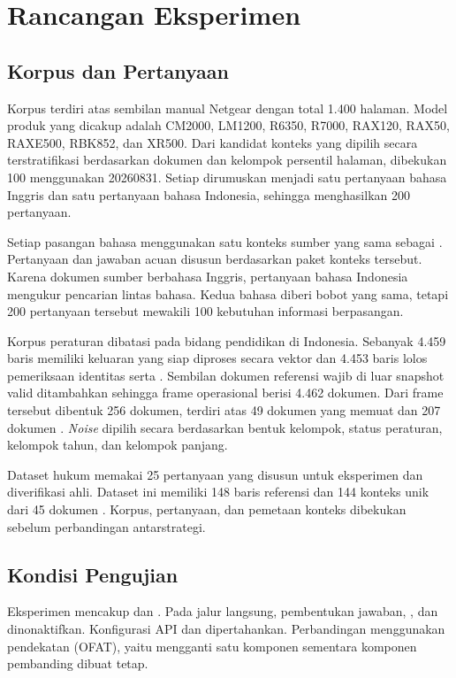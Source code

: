\section{Rancangan Eksperimen}
\subsection{Korpus dan Pertanyaan}
Korpus  terdiri atas sembilan manual Netgear dengan total 1.400 halaman. Model produk yang dicakup adalah CM2000, LM1200, R6350, R7000, RAX120, RAX50, RAXE500, RBK852, dan XR500. Dari kandidat konteks yang dipilih secara terstratifikasi berdasarkan dokumen dan kelompok persentil halaman, dibekukan 100  menggunakan  20260831. Setiap  dirumuskan menjadi satu pertanyaan bahasa Inggris dan satu pertanyaan bahasa Indonesia, sehingga menghasilkan 200 pertanyaan.

Setiap pasangan bahasa menggunakan satu konteks sumber yang sama sebagai . Pertanyaan dan jawaban acuan disusun berdasarkan paket konteks tersebut. Karena dokumen sumber berbahasa Inggris, pertanyaan bahasa Indonesia mengukur pencarian lintas bahasa. Kedua bahasa diberi bobot yang sama, tetapi 200 pertanyaan tersebut mewakili 100 kebutuhan informasi berpasangan.

Korpus peraturan dibatasi pada bidang pendidikan di Indonesia. Sebanyak 4.459 baris memiliki keluaran  yang siap diproses secara vektor dan 4.453 baris lolos pemeriksaan identitas serta . Sembilan dokumen referensi wajib di luar snapshot valid ditambahkan sehingga frame operasional berisi 4.462 dokumen. Dari frame tersebut dibentuk  256 dokumen, terdiri atas 49 dokumen yang memuat  dan 207 dokumen . \emph{Noise} dipilih secara  berdasarkan bentuk kelompok, status peraturan, kelompok tahun, dan kelompok panjang.

Dataset hukum memakai 25 pertanyaan yang disusun untuk eksperimen dan diverifikasi ahli. Dataset ini memiliki 148 baris referensi dan 144 konteks unik dari 45 dokumen . Korpus, pertanyaan, dan pemetaan konteks dibekukan sebelum perbandingan antarstrategi.

\subsection{Kondisi Pengujian}
Eksperimen mencakup  dan . Pada jalur  langsung, pembentukan jawaban, , dan  dinonaktifkan. Konfigurasi API dan  dipertahankan. Perbandingan menggunakan pendekatan  (OFAT), yaitu mengganti satu komponen sementara komponen pembanding dibuat tetap.

